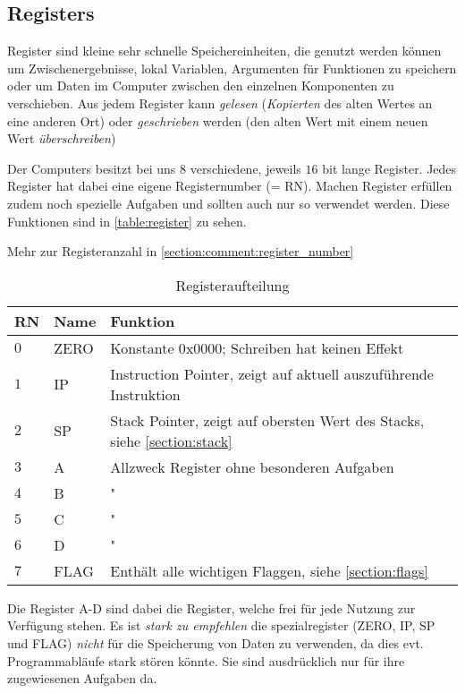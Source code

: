 \documentclass{scrartcl}
\begin{document}
\subsection{Registers}
Register sind kleine sehr schnelle Speichereinheiten, die genutzt werden können um Zwischenergebnisse, lokal Variablen, Argumenten für Funktionen zu speichern oder um Daten im Computer zwischen den einzelnen Komponenten zu verschieben. Aus jedem Register kann \emph{gelesen} (\emph{Kopierten} des alten Wertes an eine anderen Ort) oder \emph{geschrieben} werden (den alten Wert mit einem neuen Wert \emph{überschreiben})

Der Computers besitzt bei uns $8$ verschiedene, jeweils $16$ bit lange Register. Jedes Register hat dabei eine eigene Registernumber (= RN). Machen Register erfüllen zudem noch spezielle Aufgaben und sollten auch nur so verwendet werden. Diese Funktionen sind in \autoref{table:register} zu sehen.

Mehr zur Registeranzahl in \autoref{section:comment:register_number}

\begin{center}
	\begin{table}[h]
		\caption{\label{table:register} Registeraufteilung}
		\begin{tabular}{l | l | l}
			RN & Name & Funktion\\
			\hline
			$0$ & ZERO & Konstante $0\text{x}0000$; Schreiben hat keinen Effekt\\
			$1$ & IP & Instruction Pointer, zeigt auf aktuell auszuführende Instruktion\\
			$2$ & SP & Stack Pointer, zeigt auf obersten Wert des Stacks, siehe \ref{section:stack} \\
			$3$ & A & Allzweck Register ohne besonderen Aufgaben \\
			$4$ & B & " \\
			$5$ & C & " \\
			$6$ & D & " \\
			$7$ & FLAG & Enthält alle wichtigen Flaggen, siehe \autoref{section:flags} \\
		\end{tabular}
	\end{table}
\end{center}

Die Register A-D sind dabei die Register, welche frei für jede Nutzung zur Verfügung stehen. Es ist \emph{stark zu empfehlen} die spezialregister (ZERO, IP, SP und FLAG) \emph{nicht} für die Speicherung von Daten zu verwenden, da dies evt. Programmabläufe stark stören könnte. Sie sind ausdrücklich nur für ihre zugewiesenen Aufgaben da.
\end{document}
